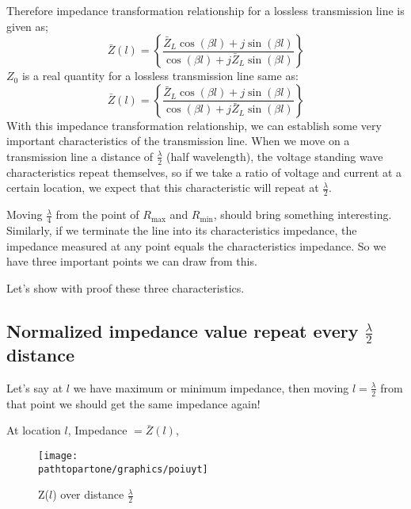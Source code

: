 Therefore impedance transformation relationship for a lossless transmission line is given as;
\begin{equation}
\bar{Z}(l) = \left\lbrace \frac{\bar{Z}_L\cos(\beta l) + j\sin(\beta l)}{\cos(\beta l) + j\bar{Z}_L\sin(\beta l)}\right\rbrace
\label{eqn:implossless}
\end{equation}
$Z_0$ is a real quantity for a lossless transmission line same as:
\begin{equation}
\bar{Z}(l) = \left\lbrace \frac{\bar{Z}_L\cos(\beta l) + j\sin(\beta l)}{\cos(\beta l) + j\bar{Z}_L\sin(\beta l)}\right\rbrace
\label{eqn:implosslessnorm}
\end{equation}
With this impedance transformation relationship, we can establish some very important characteristics of the transmission line. When we move on a transmission line a distance of $\frac{\lambda}{2}$ (half wavelength), the voltage standing wave characteristics repeat themselves, so if we take a ratio of voltage and current at a certain location, we expect that this characteristic will repeat at $\frac{\lambda}{2}$.

Moving $\frac{\lambda}{4}$ from the point of $R_{\max}$ and $R_{\min}$, should bring something interesting. Similarly, if we terminate the line into its characteristics impedance, the impedance measured at any point equals the characteristics impedance. So we have three important points we can draw from this.

Let's show with proof these three characteristics.

\subsection{Normalized impedance value repeat every $\frac{\lambda}{2}$ distance}
Let's say at $l$ we have maximum or minimum impedance, then moving $l=\frac{\lambda}{2}$ from that point we should get the same impedance again!

At location $l$, Impedance $= \bar{Z}(l)$,
\begin{figure}[h]
\centering
\texttt{[image: \\pathtopartone/graphics/poiuyt]}
\caption{Z($l$) over distance $\frac{\lambda}{2}$}
\label{fig:astyuif}
\end{figure}

